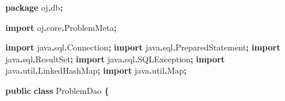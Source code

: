 \documentclass[
  11pt,
]{ctexart}
\newenvironment{Shaded}{\begin{snugshade}}{\end{snugshade}}
\newcommand{\ImportTok}[1]{#1}
\newcommand{\KeywordTok}[1]{\textcolor[rgb]{0.13,0.29,0.53}{\textbf{#1}}}
\newcommand{\NormalTok}[1]{#1}
\newcommand{\OperatorTok}[1]{\textcolor[rgb]{0.81,0.36,0.00}{\textbf{#1}}}
\begin{document}
\begin{Shaded}
\begin{Highlighting}[]
\KeywordTok{package}\ImportTok{ oj}\OperatorTok{.}\ImportTok{db}\OperatorTok{;}

\KeywordTok{import} \ImportTok{oj}\OperatorTok{.}\ImportTok{core}\OperatorTok{.}\ImportTok{ProblemMeta}\OperatorTok{;}

\KeywordTok{import} \ImportTok{java}\OperatorTok{.}\ImportTok{sql}\OperatorTok{.}\ImportTok{Connection}\OperatorTok{;}
\KeywordTok{import} \ImportTok{java}\OperatorTok{.}\ImportTok{sql}\OperatorTok{.}\ImportTok{PreparedStatement}\OperatorTok{;}
\KeywordTok{import} \ImportTok{java}\OperatorTok{.}\ImportTok{sql}\OperatorTok{.}\ImportTok{ResultSet}\OperatorTok{;}
\KeywordTok{import} \ImportTok{java}\OperatorTok{.}\ImportTok{sql}\OperatorTok{.}\ImportTok{SQLException}\OperatorTok{;}
\KeywordTok{import} \ImportTok{java}\OperatorTok{.}\ImportTok{util}\OperatorTok{.}\ImportTok{LinkedHashMap}\OperatorTok{;}
\KeywordTok{import} \ImportTok{java}\OperatorTok{.}\ImportTok{util}\OperatorTok{.}\ImportTok{Map}\OperatorTok{;}

\KeywordTok{public} \KeywordTok{class}\NormalTok{ ProblemDao }\OperatorTok{\{}


\end{Highlighting}
\end{Shaded}
\end{document}
